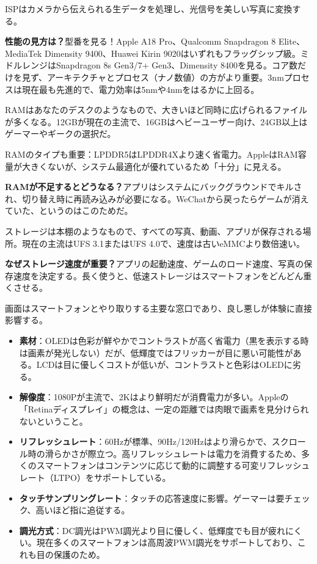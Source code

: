 
ISPはカメラから伝えられる生データを処理し、光信号を美しい写真に変換する。

\textbf{性能の見方は？}型番を見る！Apple A18 Pro、Qualcomm Snapdragon 8 Elite、MediaTek Dimensity 9400、Huawei Kirin 9020はいずれもフラッグシップ級。ミドルレンジはSnapdragon 8s Gen3/7+ Gen3、Dimensity 8400を見る。コア数だけを見ず、アーキテクチャとプロセス（ナノ数値）の方がより重要。3nmプロセスは現在最も先進的で、電力効率は5nmや4nmをはるかに上回る。


RAMはあなたのデスクのようなもので、大きいほど同時に広げられるファイルが多くなる。12GBが現在の主流で、16GBはヘビーユーザー向け、24GB以上はゲーマーやギークの選択だ。

RAMのタイプも重要：LPDDR5はLPDDR4Xより速く省電力。AppleはRAM容量が大きくないが、システム最適化が優れているため「十分」に見える。

\textbf{RAMが不足するとどうなる？}アプリはシステムにバックグラウンドでキルされ、切り替え時に再読み込みが必要になる。WeChatから戻ったらゲームが消えていた、というのはこのためだ。


ストレージは本棚のようなもので、すべての写真、動画、アプリが保存される場所。現在の主流はUFS 3.1またはUFS 4.0で、速度は古いeMMCより数倍速い。

\textbf{なぜストレージ速度が重要？}アプリの起動速度、ゲームのロード速度、写真の保存速度を決定する。長く使うと、低速ストレージはスマートフォンをどんどん重くさせる。


画面はスマートフォンとやり取りする主要な窓口であり、良し悪しが体験に直接影響する。

\begin{itemize}
  \item \textbf{素材}：OLEDは色彩が鮮やかでコントラストが高く省電力（黒を表示する時は画素が発光しない）だが、低輝度ではフリッカーが目に悪い可能性がある。LCDは目に優しくコストが低いが、コントラストと色彩はOLEDに劣る。
  \item \textbf{解像度}：1080Pが主流で、2Kはより鮮明だが消費電力が多い。Appleの「Retinaディスプレイ」の概念は、一定の距離では肉眼で画素を見分けられないということ。
  \item \textbf{リフレッシュレート}：60Hzが標準、90Hz/120Hzはより滑らかで、スクロール時の滑らかさが際立つ。高リフレッシュレートは電力を消費するため、多くのスマートフォンはコンテンツに応じて動的に調整する可変リフレッシュレート（LTPO）をサポートしている。
  \item \textbf{タッチサンプリングレート}：タッチの応答速度に影響。ゲーマーは要チェック、高いほど指に追従する。
  \item \textbf{調光方式}：DC調光はPWM調光より目に優しく、低輝度でも目が疲れにくい。現在多くのスマートフォンは高周波PWM調光をサポートしており、これも目の保護のため。
\end{itemize}

